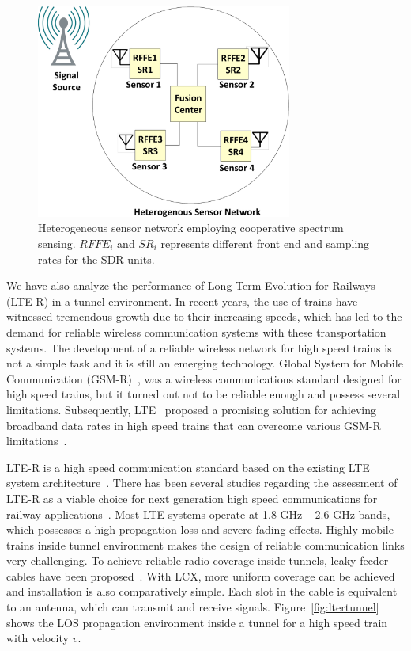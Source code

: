 \begin{figure}[!ht]
\label{fig:css}
\centering
\includegraphics[width=0.75\textwidth,keepaspectratio]{images/Gill/figs/introdiag.eps} 
\caption{Heterogeneous sensor network employing cooperative spectrum sensing. $RFFE_i$ and $SR_i$ represents different front end and sampling rates for the SDR units.}
\end{figure}

We have also analyze the performance of Long Term Evolution for Railways (LTE-R) in a tunnel environment. In recent years, the use of trains have witnessed tremendous growth due to their increasing speeds, which has led to the demand for reliable wireless communication systems with these transportation systems. The development of a reliable wireless network for high speed trains is not a simple task and it is still an emerging technology. Global System for Mobile Communication (GSM-R)~\cite{trlter1}, was a wireless communications standard designed for high speed trains, but it turned out not to be reliable enough and possess several limitations. Subsequently, LTE~\cite{trlter2} proposed a promising solution for achieving broadband data rates in high speed trains that can overcome various GSM-R limitations~\cite{arlter3,inplter4}. 

LTE-R is a high speed communication standard based on the existing LTE system architecture~\cite{inplter4}. There has been several studies regarding the assessment of LTE-R as a viable choice for next generation high speed communications for railway applications~\cite{inplter5,inplter6}. Most LTE systems operate at 1.8 GHz -- 2.6 GHz bands, which possesses a high propagation loss and severe fading effects. Highly mobile trains inside tunnel environment makes the design of reliable communication links very challenging. To achieve reliable radio coverage inside tunnels, leaky feeder cables have been proposed~\cite{arlter7}. With LCX, more uniform coverage can be achieved and installation is also comparatively simple. Each slot in the cable is equivalent to an antenna, which can transmit and receive signals. Figure~\ref{fig:ltertunnel} shows the LOS propagation environment inside a tunnel for a high speed train with velocity $v$.

